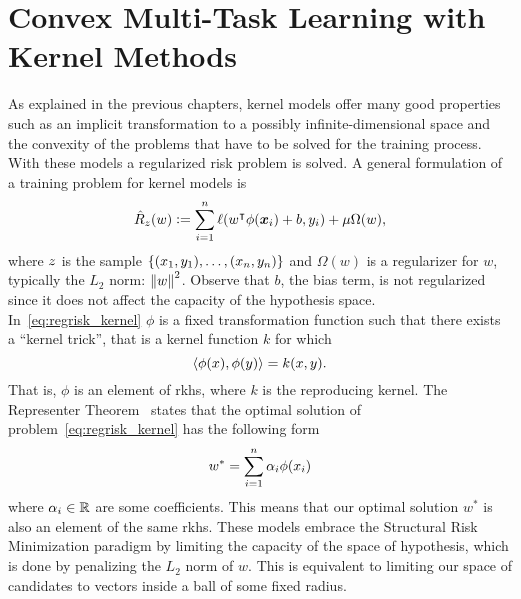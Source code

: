 \section{Convex Multi-Task Learning with Kernel Methods}\label{sec:convexmlt_kernel}
As explained in the previous chapters, kernel models offer many good properties such as an implicit transformation to a possibly infinite-dimensional space and the convexity of the problems that have to be solved for the training process. With these models a regularized risk problem is solved.
A general formulation of a training problem for kernel models is 
\begin{equation}
    \label{eq:regrisk_kernel}
    \emprisk({w}) \defeq \sum_{i=1}^{\nsamples} \lossf({w}^\intercal {\phi(\fv{x}_i)} + b, y_i) + \mu \Omega({w}) ,
\end{equation}
where $z$ is the sample $\{(x_1, y_1), \ldots, (x_n, y_n)\}$ and $\Omega(w)$ is a regularizer for ${w}$, typically the $L_2$ norm: $\left\lVert w\right\rVert^2$. Observe that $b$, the bias term, is not regularized since it does not affect the capacity of the hypothesis space.
In~\eqref{eq:regrisk_kernel} $\phi$ is a fixed transformation function such that there exists a ``kernel trick'', that is a kernel function $k$ for which
\begin{equation}
    \nonumber
    \left\langle \phi(x), \phi(y) \right\rangle = k(x, y).
\end{equation}
That is, $\phi$ is an element of \acrshort{rkhs}, where $k$ is the reproducing kernel. 
The Representer Theorem~\citep*{ScholkopfHS01} states that the optimal solution of problem~\eqref{eq:regrisk_kernel} has the following form
\begin{equation}
    \nonumber
    w^* = \sum_{i=1}^n \alpha_i \phi(x_i)
\end{equation}
where $\alpha_i \in \mathbb{R}$ are some coefficients. This means that our optimal solution $w^*$ is also an element of the same \acrshort{rkhs}.
These models embrace the Structural Risk Minimization paradigm by limiting the capacity of the space of hypothesis, which is done by penalizing the $L_2$ norm of $w$. This is equivalent to limiting our space of candidates to vectors inside a ball of some fixed radius.

